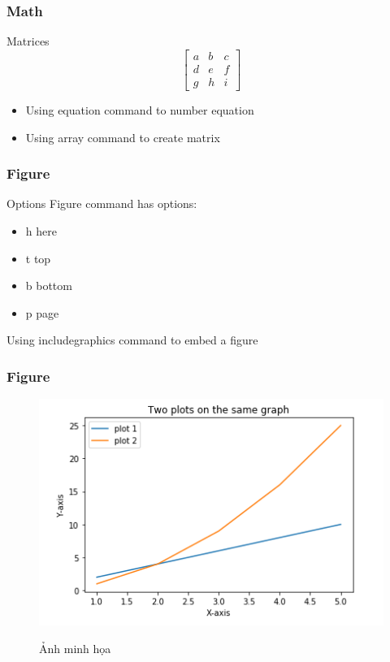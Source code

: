 \documentclass[english,10pt,table]{beamer}
\begin{document}
\frame
{
	\frametitle{Math}
	\begin{block}{Matrices}	
		\begin{equation}
		\left[\begin{array}{ccc}
		a & b & c \\
		d & e & f \\
		g & h & i
		\end{array}\right]
		\end{equation}
		\begin{itemize}
			\item Using equation command to number equation
			\item Using array command to create matrix
		\end{itemize}
		
	\end{block}
}

\frame
{
	\frametitle{Figure}
	\begin{block}{Options}	
		Figure command has options:
		\begin{itemize}
			\item h here 
			\item t top
			\item b bottom
			\item p page
		\end{itemize}
	Using includegraphics command to embed a figure	
	\end{block}
}


\frame
{
	\frametitle{Figure}	
\begin{figure}[h]
	\centering
	
	\includegraphics[width=0.75\linewidth]{IMG/mpl.png}
	\label{fig:Mlp}
	\caption{Ảnh minh họa}
\end{figure}
}

\end{document}
